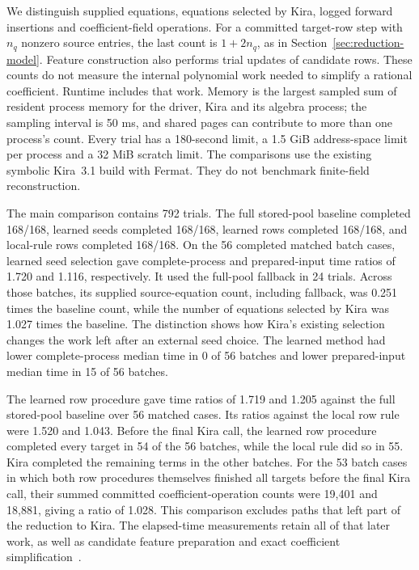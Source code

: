 We distinguish supplied equations, equations selected by Kira,
logged forward insertions and coefficient-field operations.
For a committed target-row step with $n_q$ nonzero source entries,
the last count is $1+2n_q$, as in
Section~\ref{sec:reduction-model}. Feature construction also performs
trial updates of candidate rows. These counts do not measure the
internal polynomial work needed to simplify a rational coefficient.
Runtime includes that work. Memory is the largest sampled sum of
resident process memory for the driver, Kira and its algebra process;
the sampling interval is 50 ms, and shared pages can contribute to
more than one process's count. Every trial has a 180-second limit,
a 1.5 GiB address-space limit per process and a 32 MiB scratch limit.
The comparisons use the existing symbolic Kira~3.1 build with Fermat.
They do not benchmark finite-field reconstruction.

The main comparison contains 792 trials. The full stored-pool
baseline completed 168/168, learned seeds completed 168/168,
learned rows completed 168/168, and local-rule rows completed
168/168. On the 56 completed matched batch cases,
learned seed selection gave complete-process and prepared-input time
ratios of 1.720 and 1.116, respectively. It used the full-pool fallback
in 24 trials.
Across those batches, its supplied source-equation count, including
fallback, was 0.251 times the baseline count, while the
number of equations selected by Kira was 1.027 times
the baseline. The distinction shows how Kira's existing selection
changes the work left after an external seed choice.
The learned method had lower complete-process median time in
0 of 56 batches and lower prepared-input
median time in 15 of 56 batches.

The learned row procedure gave time ratios of 1.719 and 1.205
against the full stored-pool baseline over 56 matched
cases. Its ratios against the local row rule were 1.520 and 1.043.
Before the final Kira call, the learned row procedure completed every
target in 54 of the 56 batches, while the local rule did
so in 55. Kira completed the remaining terms in the
other batches.
For the 53 batch cases in which both row procedures themselves
finished all targets before the final Kira call, their summed
committed coefficient-operation counts were 19,401 and
18,881, giving a ratio of 1.028.
This comparison excludes paths that left part of the reduction to
Kira. The elapsed-time measurements retain all of that later work,
as well as candidate feature preparation and exact coefficient
simplification~\cite{KiraCostComparisonData}.

